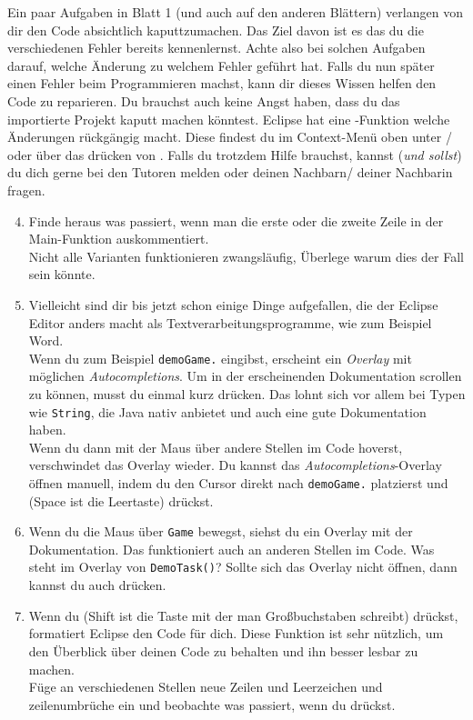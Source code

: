 \begin{Infobox}[Fehler]
    Ein paar Aufgaben in Blatt 1 (und auch auf den anderen Blättern) verlangen von dir den Code absichtlich kaputtzumachen.
    Das Ziel davon ist es das du die verschiedenen Fehler bereits kennenlernst.\newline
    Achte also bei solchen Aufgaben darauf, welche Änderung zu welchem Fehler geführt hat.
    Falls du nun später einen Fehler beim Programmieren machst, kann dir dieses Wissen helfen den Code zu reparieren.\newline
    Du brauchst auch keine Angst haben, dass du das importierte Projekt kaputt machen könntest.
    Eclipse hat eine -Funktion welche Änderungen rückgängig macht.
    Diese findest du im Context-Menü oben unter / oder über das drücken von .\newline
    Falls du trotzdem Hilfe brauchst, kannst (\emph{und sollst}) du dich gerne bei den Tutoren melden oder deinen Nachbarn/ deiner Nachbarin fragen.
\end{Infobox}

\begin{enumerate}
	\setcounter{enumi}{3}
	\item Finde heraus was passiert, wenn man die erste oder die zweite Zeile in der Main-Funktion auskommentiert.\\
	\hint Nicht alle Varianten funktionieren zwangsläufig, Überlege warum dies der Fall sein könnte.
	\item\label{ex1e} Vielleicht sind dir bis jetzt schon einige Dinge aufgefallen, die der Eclipse Editor anders macht als Textverarbeitungsprogramme, wie zum Beispiel Word.\\
	Wenn du zum Beispiel \lstinline{demoGame.} eingibst, erscheint ein \textit{Overlay} mit möglichen \textit{Autocompletions}. Um in der erscheinenden Dokumentation scrollen zu können, musst du einmal kurz  drücken. Das lohnt sich vor allem bei Typen wie \lstinline{String}, die Java nativ anbietet und auch eine gute Dokumentation haben.\\
	Wenn du dann mit der Maus über andere Stellen im Code hoverst, verschwindet das Overlay wieder.
	Du kannst das \textit{Autocompletions}-Overlay öffnen manuell, indem du den Cursor direkt nach \lstinline{demoGame.} platzierst und  (Space ist die Leertaste) drückst.
	\item
	Wenn du die Maus über \lstinline{Game} bewegst, siehst du ein Overlay mit der Dokumentation.
	Das funktioniert auch an anderen Stellen im Code.
	Was steht im Overlay von \lstinline{DemoTask()}? Sollte sich das Overlay nicht öffnen, dann kannst du auch  drücken.
	\item
	Wenn du  (Shift ist die Taste mit der man Großbuchstaben schreibt) drückst, formatiert Eclipse den Code für dich. Diese Funktion ist sehr nützlich, um den Überblick über deinen Code zu behalten und ihn besser lesbar zu machen.\\
	Füge an verschiedenen Stellen neue Zeilen und Leerzeichen und zeilenumbrüche ein und beobachte was passiert, wenn du  drückst.
\end{enumerate}


